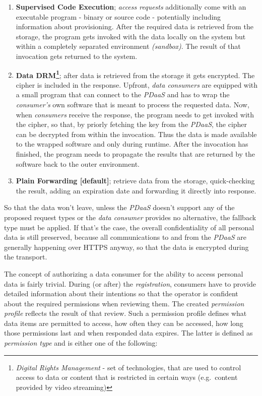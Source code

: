 \documentclass[12pt,english,a4paper,titlepage,cleardoublepage=empty,dottedtoc]{report}
\providecommand{\tightlist}{%
  \setlength{\itemsep}{0pt}\setlength{\parskip}{0pt}}
\begin{document}
\begin{enumerate}
\def\labelenumi{\alph{enumi})}
\tightlist
\item
  \textbf{Supervised Code Execution}; \emph{access requests}
  additionally come with an executable program - binary or source code -
  potentially including information about provisioning. After the
  required data is retrieved from the storage, the program gets invoked
  with the data locally on the system but within a completely separated
  environment \emph{(sandbox)}. The result of that invocation gets
  returned to the system.
\item
  \textbf{Data DRM\footnote{\emph{Digital Rights Management} - set of
    technologies, that are used to control access to data or content
    that is restricted in certain ways (e.g.~content provided by video
    streaming)}}; after data is retrieved from the storage it gets
  encrypted. The cipher is included in the response. Upfront, \emph{data
  consumers} are equipped with a small program that can connect to the
  \emph{PDaaS} and has to wrap the \emph{consumer's} own software that
  is meant to process the requested data. Now, when \emph{consumers}
  receive the response, the program needs to get invoked with the
  cipher, so that, by priorly fetching the key from the \emph{PDaaS},
  the cipher can be decrypted from within the invocation. Thus the data
  is made available to the wrapped software and only during runtime.
  After the invocation has finished, the program needs to propagate the
  results that are returned by the software back to the outer
  environment.
\item
  \textbf{Plain Forwarding {[}default{]}}; retrieve data from the
  storage, quick-checking the result, adding an expiration date and
  forwarding it directly into response.
\end{enumerate}

So that the data won't leave, unless the \emph{PDaaS} doesn't support
any of the proposed request types or the \emph{data consumer} provides
no alternative, the fallback type must be applied. If that's the case,
the overall confidentiality of all personal data is still preserved,
because all communications to and from the \emph{PDaaS} are generally
happening over HTTPS anyway, so that the data is encrypted during the
transport.

The concept of authorizing a data consumer for the ability to access
personal data is fairly trivial. During (or after) the
\emph{registration}, consumers have to provide detailed information
about their intentions so that the operator is confident about the
required permissions when reviewing them. The created \emph{permission
profile} reflects the result of that review. Such a permission profile
defines what data items are permitted to access, how often they can be
accessed, how long those permissions last and when responded data
expires. The latter is defined as \emph{permission type} and is either
one of the following:
\end{document}
